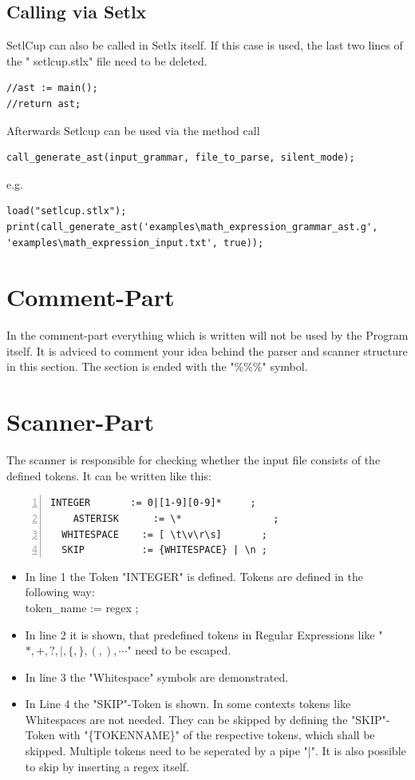 \subsection{Calling via Setlx}
SetlCup can also be called in Setlx itself. If this case is used, the last two lines of the " setlcup.stlx" file need to be deleted.
\begin{lstlisting}[frame=single,basicstyle=\footnotesize ,breaklines=true]
//ast := main();
//return ast;
\end{lstlisting}
Afterwards Setlcup can be used via the method call
\begin{lstlisting}[frame=single,basicstyle=\footnotesize ,breaklines=true]
call_generate_ast(input_grammar, file_to_parse, silent_mode);
\end{lstlisting}
e.g.
\begin{lstlisting}[frame=single,basicstyle=\footnotesize ,breaklines=true]
load("setlcup.stlx");
print(call_generate_ast('examples\math_expression_grammar_ast.g', 'examples\math_expression_input.txt', true));
\end{lstlisting}
\section{Comment-Part}
In the comment-part everything which is written will not be used by the Program itself. It is adviced to comment your idea behind the parser and scanner structure in this section.
The section is ended with the "\%\%\%" symbol.

\section{Scanner-Part}
The scanner is responsible for checking whether the input file consists of the defined tokens. It can be written like this:
\begin{lstlisting}[frame=single,numbers=left,basicstyle=\footnotesize]
  INTEGER       := 0|[1-9][0-9]*     ;
	ASTERISK      := \*                ;
  WHITESPACE    := [ \t\v\r\s]       ;
  SKIP          := {WHITESPACE} | \n ;
\end{lstlisting}
\begin{itemize}
	\item In line 1 the Token "INTEGER" is defined. Tokens are defined in the following way:\\
					token\_name := regex ;
	\item In line 2 it is shown, that predefined tokens in Regular Expressions like "$*,+,?,|,\{,\},(,),\cdots$" need to be escaped.
	\item In line 3 the "Whitespace" symbols are demonstrated.
	\item In Line 4 the "SKIP"-Token is shown. In some contexts tokens like Whitespaces are not needed. They can be skipped by defining the "SKIP"-Token with "\{TOKENNAME\}" of the respective tokens, which shall be skipped. Multiple tokens need to be seperated by a pipe "|". It is also possible to skip by inserting a regex itself.
\end{itemize}

